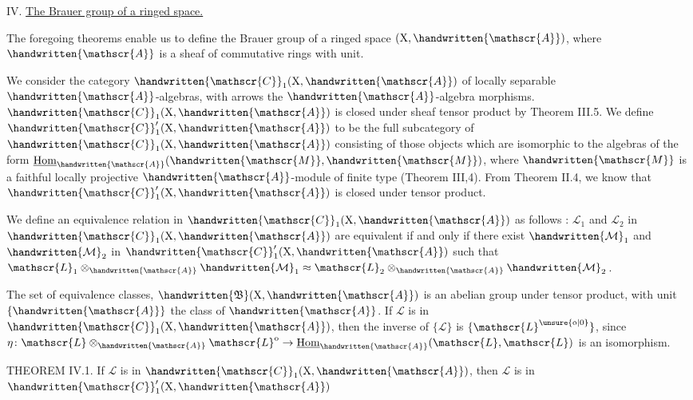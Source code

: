 \begin{center}
IV. \uline{The Brauer group of a ringed space.}
\end{center}

The foregoing theorems enable us to define the Brauer group of a ringed space $(\mathrm{X},\handwritten{\mathscr{A}})$, where $\handwritten{\mathscr{A}}$ is a sheaf of commutative rings with unit.

We consider the category $\handwritten{\mathscr{C}}_1(\mathrm{X},\handwritten{\mathscr{A}})$ of locally separable $\handwritten{\mathscr{A}}$-algebras, with arrows the $\handwritten{\mathscr{A}}$-algebra morphisms. $\handwritten{\mathscr{C}}_1(\mathrm{X},\handwritten{\mathscr{A}})$ is closed under sheaf tensor product by Theorem III.5. We define $\handwritten{\mathscr{C}}'_1(\mathrm{X},\handwritten{\mathscr{A}})$ to be the full subcategory of $\handwritten{\mathscr{C}}_1(\mathrm{X},\handwritten{\mathscr{A}})$ consisting of those objects which are isomorphic to the algebras of the form $\underline{\mathrm{Hom}}_{\handwritten{\mathscr{A}}}(\handwritten{\mathscr{M}},\handwritten{\mathscr{M}})$, where $\handwritten{\mathscr{M}}$ is a faithful locally projective $\handwritten{\mathscr{A}}$-module of finite type (Theorem III,4). From Theorem II.4, we know that $\handwritten{\mathscr{C}}'_1(\mathrm{X},\handwritten{\mathscr{A}})$ is closed under tensor product.

We define an equivalence relation in $\handwritten{\mathscr{C}}_1(\mathrm{X},\handwritten{\mathscr{A}})$ as follows : $\mathscr{L}_1$ and $\mathscr{L}_2$ in $\handwritten{\mathscr{C}}_1(\mathrm{X},\handwritten{\mathscr{A}})$ are equivalent if and only if there exist $\handwritten{\mathcal{M}}_1$ and $\handwritten{\mathcal{M}}_2$ in $\handwritten{\mathscr{C}}'_1(\mathrm{X},\handwritten{\mathscr{A}})$ such that $\mathscr{L}_1\otimes_{\handwritten{\mathscr{A}}}\handwritten{\mathcal{M}}_1\approx \mathscr{L}_2\otimes_{\handwritten{\mathscr{A}}}\handwritten{\mathcal{M}}_2$.

The set of equivalence classes, $\handwritten{\mathfrak{B}}(\mathrm X,\handwritten{\mathscr{A}})$ is an abelian group under tensor product, with unit $\{\handwritten{\mathscr{A}}\}$ the class of $\handwritten{\mathscr{A}}$. If $\mathscr{L}$ is in $\handwritten{\mathscr{C}}_1(\mathrm{X},\handwritten{\mathscr{A}})$, then the inverse of $\{\mathscr{L}\}$ is $\{\mathscr{L}^{\unsure{\mathrm{o}|0}}\}$, since $\eta\colon \mathscr{L}\otimes_{\handwritten{\mathscr{A}}}\mathscr{L}^{\mathrm{o}}\to \underline{\mathrm{Hom}}_{\handwritten{\mathscr{A}}}(\mathscr{L},\mathscr{L})$ is an isomorphism.

THEOREM IV.1. If $\mathscr{L}$ is in $\handwritten{\mathscr{C}}_1(\mathrm{X},\handwritten{\mathscr{A}})$, then $\mathscr{L}$ is in $\handwritten{\mathscr{C}}'_1(\mathrm{X},\handwritten{\mathscr{A}})$
